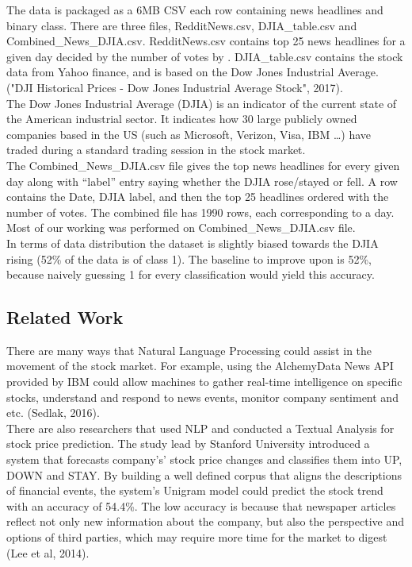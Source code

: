 \documentclass[11pt,a4paper]{article}
\begin{document}
The data is packaged as a 6MB CSV each row containing news headlines and binary class. There are three files, RedditNews.csv, DJIA\_table.csv and Combined\_News\_DJIA.csv. RedditNews.csv contains top 25 news headlines for a given day decided by the number of votes by . DJIA\_table.csv contains the stock data from Yahoo finance, and is based on the Dow Jones Industrial Average. ("DJI Historical Prices - Dow Jones Industrial Average Stock", 2017). \\

The Dow Jones Industrial Average (DJIA) is an indicator of the current state of the American industrial sector. It indicates how 30 large publicly owned companies based in the US (such as Microsoft, Verizon, Visa, IBM …) have traded during a standard trading session in the stock market.\\

 The Combined\_News\_DJIA.csv file gives the top news headlines for every given day along with “label” entry saying whether the DJIA rose/stayed or fell. A row contains the Date, DJIA label, and then the top 25 headlines ordered with the number of votes. The combined file has 1990 rows, each corresponding to a day. Most of our working was performed on Combined\_News\_DJIA.csv file.\\

In terms of data distribution the dataset is slightly biased towards the DJIA rising (52\% of the data is of class 1). The baseline to improve upon is 52\%, because naively guessing 1 for every classification would yield this accuracy.\\


\subsection{Related Work}
There are many ways that Natural Language Processing could assist in the movement of the  stock market. For example, using the AlchemyData News API provided by IBM could allow machines to gather real-time intelligence on specific stocks, understand and respond to news events, monitor company sentiment and etc. (Sedlak, 2016).\\

There are also researchers that used NLP and conducted a Textual Analysis for stock price prediction. The study lead by Stanford University introduced a system that forecasts company's’ stock price changes and classifies them into UP, DOWN and STAY. By building a well defined corpus that aligns the descriptions of financial events, the system's Unigram model could predict the stock trend with an accuracy of 54.4\%. The low accuracy is because that  newspaper articles reflect not only new information about the company, but also the perspective and options of third parties, which may require more time for the market to digest (Lee et al, 2014).\\
\end{document}
